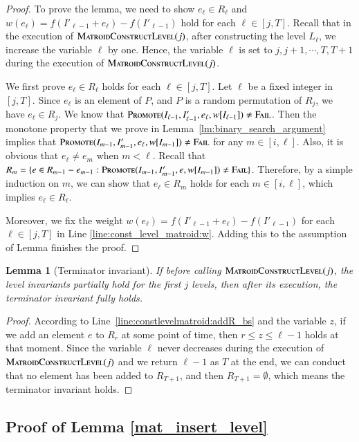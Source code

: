 \documentclass[11pt]{article}
\newtheorem{lemma}[theorem]{Lemma}
\newcommand{\err}{{\textsc{Fail}}}
\newcommand{\MatroidConstLevel}{\textsc{MatroidConstructLevel}}
\newcommand{\replacementTester}{\textsc{Promote}}
\begin{document}
\begin{proof} 
To prove the lemma, we need to show $e_\ell \in R_\ell$ and  $w(e_\ell) = f(I'_{\ell-1} + e_\ell) - f(I'_{\ell-1})$ hold for each $\ell \in [j,T]$.
Recall that in the execution of $\MatroidConstLevel{}(j)$, after constructing the level $L_\ell$, we increase the variable $\ell$ by one. Hence, the variable $\ell$ is set to $j, j+1,\cdots, T,T+1$ during the execution of $\MatroidConstLevel{}(j)$.

We first prove $e_\ell \in R_\ell$ holds for each $\ell \in[j,T]$. Let $\ell $ be a fixed integer in  $[j,T]$.  Since $e_\ell$ is an element of $P$, and $P$ is a random permutation of $R_j$, we have $e_\ell \in R_j$. 
We know that $\replacementTester(I_{\ell-1}, I'_{\ell-1}, e_\ell, w[I_{\ell-1}]) \ne \err$. Then the monotone property that we prove in Lemma~\ref{lm:binary_search_argument} implies that $\replacementTester(I_{m-1}, I'_{m-1}, e_{\ell}, w[I_{m-1}]) \ne \err$ for any $m \in [i,\ell]$. Also, it is obvious that $e_\ell \neq e_{m}$ when $m<\ell$. Recall that $R_{m}= \{ e \in R_{m-1} - e_{m-1}: \replacementTester{}(I_{m-1}, I'_{m-1}, e, w[I_{m-1}]) \ne \err\}$. Therefore, by a simple induction on  $m$, we  can  show  that $e_\ell \in R_{m}$ holds for each  $m\in[i,\ell]$, which implies $e_\ell \in R_\ell$.

Moreover, we fix the weight $w(e_\ell)=f(I'_{\ell - 1} + e_\ell) - f(I'_{\ell -1})$ for each $\ell\in[j,T]$ in Line \ref{line:const_level_matroid:w}.
Adding this to the assumption of Lemma finishes the proof.
\end{proof}
\begin{lemma}[Terminator invariant]
\label{lm:terminator:leveling}
If before calling $\MatroidConstLevel{}(j)$, the level invariants partially hold for the first $j$ levels,
then after its execution, the terminator invariant fully holds. 
\end{lemma}

\begin{proof}
According to Line~\ref{line:constlevelmatroid:addR_bs} and the variable $z$, if we add an element $e$ to $R_r$ at some point of time, then $r\leq z\leq \ell-1$ holds at that moment.
Since the variable $\ell$ never decreases during the execution of $\MatroidConstLevel{}(j)$ and we return $\ell-1$ as $T$ at the end, we can conduct that no element has been added to  $R_{T+1}$, and then $R_{T+1}=\emptyset$, which means the terminator invariant holds.   
\end{proof}


\subsection{Proof of Lemma \ref{mat_insert_level}}
\label{subs:mat_insert_level}
\end{document}
